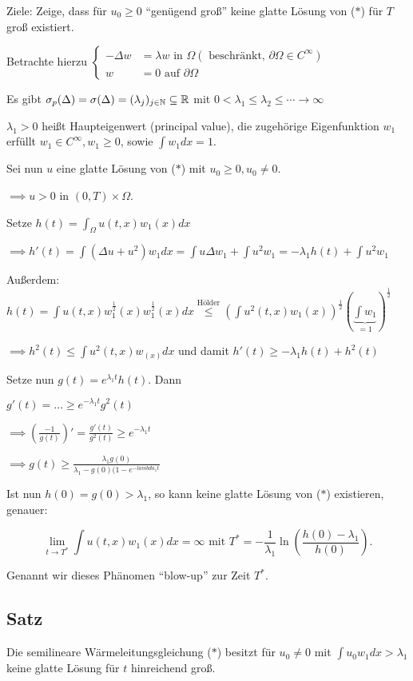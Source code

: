 Ziele: Zeige, dass für $u_0 \geq 0$ ``genügend groß'' keine glatte Lösung von ($\ast$) für $T$ groß existiert.

Betrachte hierzu $\begin{cases} -\Delta w &= \lambda w \text{ in } \Omega (\text{ beschränkt, } \partial\Omega \in C^\infty) \\ w &= 0 \text{ auf } \partial \Omega \end{cases}$

Es gibt $\sigma_p(\Delta) = \sigma(\Delta) = (\lambda_j)_{j \in \mathbb{N}} \subseteq \mathbb{R}$ mit $0 < \lambda_1 \leq \lambda_2 \leq \cdots \to \infty$

$\lambda_1 > 0$ heißt Haupteigenwert (principal value), die zugehörige Eigenfunktion $w_1$ erfüllt $w_1 \in C^\infty, w_1 \geq 0$, sowie $\int w_1 dx = 1$.

Sei nun $u$ eine glatte Lösung von ($\ast$) mit $u_0 \geq 0, u_0 \neq 0$.

$\implies u > 0$ in $(0, T) \times \Omega$.

Setze $h(t) = \int_\Omega u(t,x) w_1(x) dx$

$\implies h'(t) = \int(\Delta u + u^2)w_1 dx = \int u\Delta w_1 + \int u^2 w_1 = - \lambda_1 h(t) + \int u^2 w_1$

Außerdem: $h(t) = \int u(t,x) w_1^{\frac{1}{2}}(x) w_1^{\frac{1}{2}}(x) dx \overset{\text{Hölder}}{\leq} (\int u^2(t,x) w_1(x))^{\frac{1}{2}} (\underbrace{\int w_1}_{=1})^{\frac{1}{2}}$

$\implies h^2(t) \leq \int u^2(t,x) w_(x) dx$ und damit $h'(t) \geq -\lambda_1 h(t) + h^2(t)$

Setze nun $g(t) = e^{\lambda_1 t} h(t)$. Dann

$g'(t) = \dots \geq e^{-\lambda_1 t} g^2(t)$

$\implies (\frac{-1}{g(t)})' = \frac{g'(t)}{g^2(t)} \geq e^{-\lambda_1 t}$

$\implies g(t) \geq \frac{\lambda_1 g(0)}{\lambda_1 - g(0)(1 - e^{-lambda_1 t}}$

Ist nun $h(0) = g(0) > \lambda_1$, so kann keine glatte Lösung von ($\ast$) existieren, genauer:

$$
\lim_{t \to T^*} \int u(t,x) w_1(x) dx = \infty \text{ mit } T^* = -\frac{1}{\lambda_1} \ln (\frac{h(0) - \lambda_1}{h(0)}).
$$

Genannt wir dieses Phänomen ``blow-up'' zur Zeit $T^*$.

\subsection{Satz}

Die semilineare Wärmeleitungsgleichung ($\ast$) besitzt für $u_0 \neq 0$ mit $\int u_0 w_1 dx > \lambda_1$ keine glatte Lösung für $t$ hinreichend groß.

